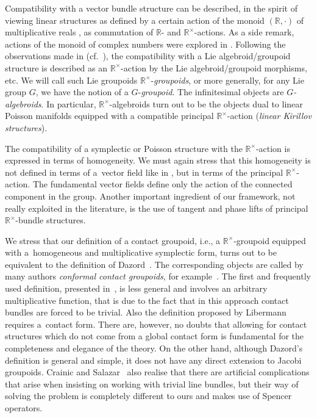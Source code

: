 \documentclass[pdftex]{sigma}
\newcommand{\R}{{\mathbb R}}
\newcommand{\ti}{\times}
\def\Rt{{\R^\times}}
\numberwithin{equation}{section}
\begin{document}
Compatibility with a vector bundle structure can be described, in the spirit of viewing linear structures as def\/ined by a certain action of the monoid $(\R,\cdot)$ of multiplicative reals \cite{Grabowski:2006,Grabowski2012}, as commutation of $\R$- and $\R^\times$-actions. As a side remark, actions of the monoid of complex numbers were explored in \cite{Jozwikowski:2016}. Following the observations made in \cite{Bursztyn:2014} (cf.\ \cite{Bruce:2014c,Bruce:2014b, Bruce:2014}), the compatibility with a Lie algebroid/groupoid structure is described as an $\R^\ti$-action by the Lie algebroid/groupoid morphisms, etc. We will call such Lie groupoids $\mathbb{R}^{\times}$-\emph{groupoids}, or more generally, for any Lie group $G$, we have the notion of a $G$-\emph{groupoid}. The inf\/initesimal objects are \emph{$G$-algebroids}. In particular, $\Rt$-algebroids turn out to be the objects dual to linear Poisson manifolds equipped with a compatible principal $\Rt$-action (\emph{linear Kirillov structures}).

The compatibility of a symplectic or Poisson structure with the $\R^\ti$-action is expressed in terms of homogeneity. We must again stress that this homogeneity is not def\/ined in terms of a~vector f\/ield like in \cite{Crainic:2007,Libermann:1995,Marle:1991}, but in terms of the principal $\R^\ti$-action. The fundamental vector f\/ields def\/ine only the action of the connected component in the group. Another important ingredient of our framework, not really exploited in the literature, is the use of tangent and phase lifts of principal $\Rt$-bundle structures.

 We stress that our def\/inition of a contact groupoid, i.e., a $\mathbb{R}^{\times}$-groupoid equipped with a~homogeneous and multiplicative symplectic form, turns out to be equivalent to the def\/inition of Dazord~\cite{Dazord:1995}. The corresponding objects are called by many authors \emph{conformal contact groupoids}, for example~\cite{Crainic:2007}. The f\/irst and frequently used def\/inition, presented in~\cite{Kerbrat:1993}, is less general and involves an arbitrary multiplicative function, that is due to the fact that in this approach contact bundles are forced to be trivial. Also the def\/inition proposed by Libermann~\cite{Libermann:1993} requires a~contact form. There are, however, no doubts that allowing for contact structures which do not come from a global contact form is fundamental for the completeness and elegance of the theory. On the other hand, although Dazord's def\/inition is general and simple, it does not have any direct extension to Jacobi groupoids. Crainic and Salazar~\cite{Crainic:2015} also realise that there are artif\/icial complications that arise when insisting on working with trivial line bundles, but their way of solving the problem is completely dif\/ferent to ours and makes use of Spencer operators.
\end{document}

